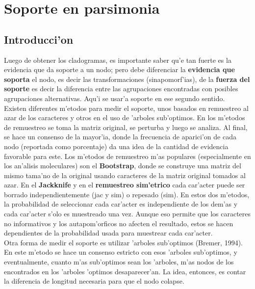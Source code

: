 \chapter{Soporte en parsimonia}
\section*{Introducci'on}
\label{ch:soporte.pars}
Luego de obtener los cladogramas, es importante saber qu'e tan fuerte es la evidencia que da soporte a un nodo; pero debe diferenciar la \textbf{evidencia que soporta} el nodo, es decir las transformaciones (sinapomorf'ias), de la \textbf{fuerza del soporte} es decir la diferencia entre las agrupaciones encontradas con posibles agrupaciones alternativas. Aqu'i se usar'a soporte en ese segundo sentido.\\
Existen diferentes m'etodos para medir el soporte, unos basados en remuestreo al azar de los caracteres y otros en el uso de 'arboles sub'optimos. En los m'etodos de remuestreo se toma la matriz original, se perturba y luego se analiza. Al final, se hace un consenso de la mayor'ia, donde la frecuencia de aparici'on de cada nodo (reportada como porcentaje) da una idea de la cantidad de evidencia favorable para este. Los m'etodos de remuestreo m'as populares (especialmente en los an'alisis moleculares) son el \textbf{Bootstrap}, donde se construye una matriz del mismo tama'no de la original usando caracteres de la matriz original tomados al azar. En el \textbf{Jackknife}  y en el \textbf{remuestreo sim'etrico}  cada car'acter puede ser borrado independientemente (jac y sim) o repesado (sim). En estos dos m'etodos, la probabilidad de seleccionar cada car'acter es independiente de los dem'as y cada car'acter s'olo es muestreado una vez. Aunque eso permite que los caracteres no informativos y los autapom'orficos no afecten el resultado, estos se hacen dependientes de la probabilidad usada para muestrear cada car'acter.\\
Otra forma de medir el soporte es utilizar 'arboles sub'optimos (Bremer, 1994). En este m'etodo se hace un consenso estricto con esos 'arboles sub'optimos, y eventualmente, cuanto m'as sub'optimos sean los 'arboles, m'as nodos de los encontrados en los 'arboles 'optimos desaparecer'an. La idea, entonces, es contar la diferencia de longitud necesaria para que el nodo colapse.\\
